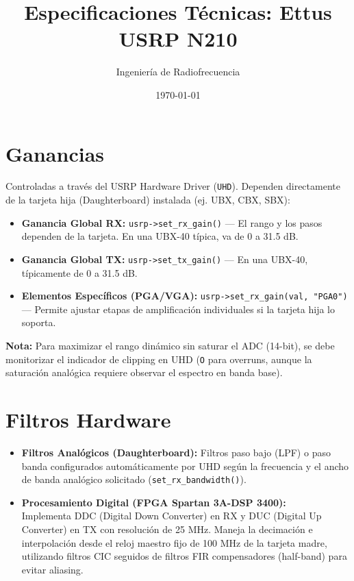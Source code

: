 \documentclass[11pt]{article}
\title{Especificaciones Técnicas: Ettus USRP N210}
\author{Ingeniería de Radiofrecuencia}
\date{\today}
\begin{document}
\maketitle
\tableofcontents
\newpage

\section{Ganancias}

Controladas a través del USRP Hardware Driver (\texttt{UHD}). Dependen directamente de la tarjeta hija (Daughterboard) instalada (ej. UBX, CBX, SBX):

\begin{itemize}
    \item \textbf{Ganancia Global RX:} \texttt{usrp->set\_rx\_gain()} — El rango y los pasos dependen de la tarjeta. En una UBX-40 típica, va de 0 a 31.5 dB.
    \item \textbf{Ganancia Global TX:} \texttt{usrp->set\_tx\_gain()} — En una UBX-40, típicamente de 0 a 31.5 dB.
    \item \textbf{Elementos Específicos (PGA/VGA):} \texttt{usrp->set\_rx\_gain(val, "PGA0")} — Permite ajustar etapas de amplificación individuales si la tarjeta hija lo soporta.
\end{itemize}

\textbf{Nota:} Para maximizar el rango dinámico sin saturar el ADC (14-bit), se debe monitorizar el indicador de clipping en UHD (\texttt{O} para overruns, aunque la saturación analógica requiere observar el espectro en banda base).

\section{Filtros Hardware}

\begin{itemize}
    \item \textbf{Filtros Analógicos (Daughterboard):} Filtros paso bajo (LPF) o paso banda configurados automáticamente por UHD según la frecuencia y el ancho de banda analógico solicitado (\texttt{set\_rx\_bandwidth()}).
    \item \textbf{Procesamiento Digital (FPGA Spartan 3A-DSP 3400):}\\
    Implementa DDC (Digital Down Converter) en RX y DUC (Digital Up Converter) en TX con resolución de 25 MHz. Maneja la decimación e interpolación desde el reloj maestro fijo de 100 MHz de la tarjeta madre, utilizando filtros CIC seguidos de filtros FIR compensadores (half-band) para evitar aliasing.
\end{itemize}
\end{document}
